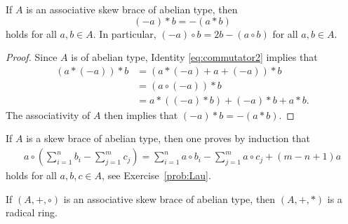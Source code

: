 \begin{lemma}\label{lem:CGIS}
    If $A$ is an associative skew brace of abelian type, then 
    \[
    (-a)*b=-(a*b)
    \]
	holds for all $a,b\in A$. In particular, $(-a)\circ b=2b-(a\circ b)$ for all $a,b\in A$. 
\end{lemma}

\begin{proof}
    Since $A$ is of abelian type, 
    Identity \eqref{eq:commutator2} implies that
    \begin{align*}
 	    (a*(-a))*b &= 
 	    (a*(-a)+a+(-a))*b\\
 	    &=(a\circ (-a))*b\\
 	    &=a*( (-a)*b)+(-a)*b+a*b.
 	 \end{align*}
     The associativity of $A$ then implies that 
     $(-a)*b=-(a*b)$.
\end{proof}

If $A$ is a skew brace of abelian type, then one proves by induction that 
\begin{align}
\label{eq:Lau}
    a\circ \left(\sum_{i=1}^n b_i-\sum_{j=1}^mc_j\right)
    =\sum_{i=1}^n a\circ b_i-\sum_{j=1}^ma\circ c_j+(m-n+1)a
\end{align}
holds for all $a,b,c\in A$, see Exercise~\ref{prob:Lau}. 





\begin{theorem}
    \label{thm:Lau}
	If $(A,+,\circ)$ is an associative skew brace of abelian type, 
	then $(A,+,*)$ is a radical ring. 
\end{theorem}

